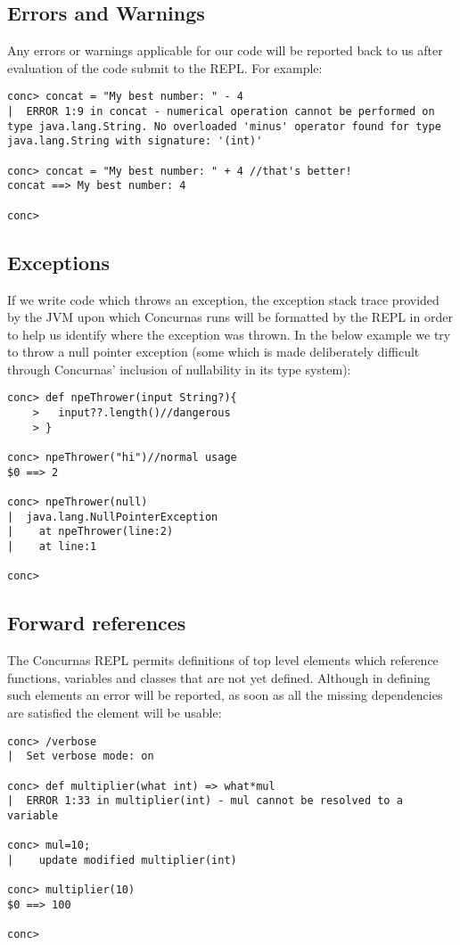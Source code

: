 \documentclass[conc-doc]{subfiles}
\begin{document}
\subsection{Errors and Warnings}
Any errors or warnings applicable for our code will be reported back to us after evaluation of the code submit to the REPL. For example:

\begin{lstlisting}[language=None]
conc> concat = "My best number: " - 4
|  ERROR 1:9 in concat - numerical operation cannot be performed on type java.lang.String. No overloaded 'minus' operator found for type java.lang.String with signature: '(int)'

conc> concat = "My best number: " + 4 //that's better!
concat ==> My best number: 4

conc> 
\end{lstlisting}

\subsection{Exceptions}
If we write code which throws an exception, the exception stack trace provided by the JVM upon which Concurnas runs will be formatted by the REPL in order to help us identify where the exception was thrown. In the below example we try to throw a null pointer exception (some which is made deliberately difficult through Concurnas' inclusion of nullability in its type system):

\begin{lstlisting}[language=None]
conc> def npeThrower(input String?){
	>   input??.length()//dangerous
	> }

conc> npeThrower("hi")//normal usage
$0 ==> 2

conc> npeThrower(null)
|  java.lang.NullPointerException
|    at npeThrower(line:2)
|    at line:1

conc>
\end{lstlisting}

\subsection{Forward references}
The Concurnas REPL permits definitions of top level elements which reference functions, variables and classes that are not yet defined. Although in defining such elements an error will be reported, as soon as all the missing dependencies are satisfied the element will be usable:

\begin{lstlisting}[language=None]
conc> /verbose
|  Set verbose mode: on

conc> def multiplier(what int) => what*mul
|  ERROR 1:33 in multiplier(int) - mul cannot be resolved to a variable

conc> mul=10;
|    update modified multiplier(int)

conc> multiplier(10)
$0 ==> 100

conc> 
\end{lstlisting}
\end{document}
